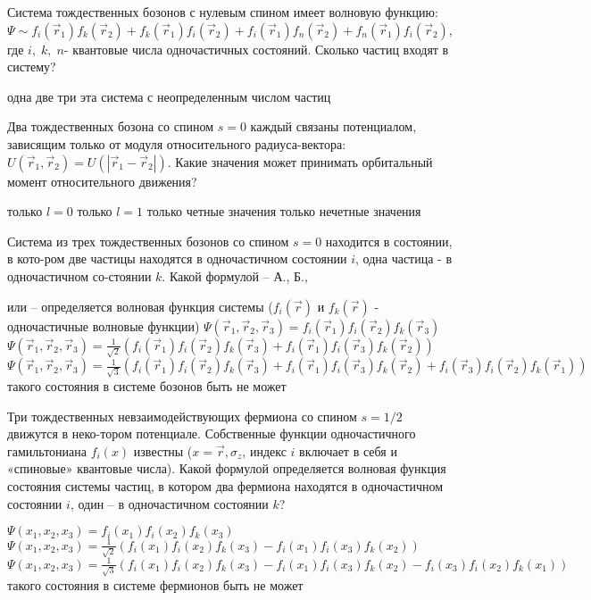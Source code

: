 \documentclass[11pt,a4paper]{exam}
\begin{document}
\begin{questions}
\question Система тождественных бозонов с нулевым спином имеет волновую функцию:
$\Psi  \sim {f_i}({\vec r_1}){f_k}({\vec r_2}) + {f_k}({\vec r_1}){f_i}({\vec r_2}) + {f_i}({\vec r_1}){f_n}({\vec r_2}) + {f_n}({\vec r_1}){f_i}({\vec r_2})$, 
где $i,\;k,\;n$- квантовые числа одночастичных состояний. Сколько частиц входят в систему?
\begin{choices}
\choice одна  
\choice две      
\choice три      
\choice эта система с неопределенным числом частиц
\end{choices}

\question Два тождественных бозона со спином $s = 0$ каждый связаны потенциалом, зависящим только от модуля относительного радиуса-вектора: $U({\vec r_1},{\vec r_2}) = U(|{\vec r_1} - {\vec r_2}|)$. Какие значения может принимать орбитальный момент относительного движения?
\begin{choices}
\choice только $l = 0$          
\choice только $l = 1$
\choice только четные значения        
\choice только нечетные значения
\end{choices}

\question Система из трех тождественных бозонов со спином $s = 0$ находится в состоянии, в кото-ром две частицы находятся в одночастичном состоянии $i$, одна частица - в одночастичном со-стоянии $k$. Какой формулой – А., Б., 
\begin{choices}
\choice или 
\choice – определяется волновая функция системы (${f_i}(\vec r)$ и ${f_k}(\vec r)$ - одночастичные волновые функции)
\choice $\Psi ({\vec r_1},{\vec r_2},{\vec r_3}) = {f_i}({\vec r_1}){f_i}({\vec r_2}){f_k}({\vec r_3})$ 
\choice $\Psi ({\vec r_1},{\vec r_2},{\vec r_3}) = \frac{1}{{\sqrt 2 }}\left( {{f_i}({{\vec r}_1}){f_i}({{\vec r}_2}){f_k}({{\vec r}_3}) + {f_i}({{\vec r}_1}){f_i}({{\vec r}_3}){f_k}({{\vec r}_2})} \right)$   
\choice $\Psi ({\vec r_1},{\vec r_2},{\vec r_3}) = \frac{1}{{\sqrt 3 }}\left( {{f_i}({{\vec r}_1}){f_i}({{\vec r}_2}){f_k}({{\vec r}_3}) + {f_i}({{\vec r}_1}){f_i}({{\vec r}_3}){f_k}({{\vec r}_2}) + {f_i}({{\vec r}_3}){f_i}({{\vec r}_2}){f_k}({{\vec r}_1})} \right)$
\choice такого состояния в системе бозонов быть не может
\end{choices}

\question Три тождественных невзаимодействующих фермиона со спином $s = 1/2$ движутся в неко-тором потенциале. Собственные функции одночастичного гамильтониана ${f_i}(x)$ известны ($x = \vec r,{\sigma _z}$, индекс $i$ включает в себя и «спиновые» квантовые числа). Какой формулой определяется волновая функция состояния системы частиц, в котором два фермиона находятся в одночастичном состоянии $i$, один – в одночастичном состоянии $k$?
\begin{choices}
\choice $\Psi ({x_1},{x_2},{x_3}) = {f_i}({x_1}){f_i}({x_2}){f_k}({x_3})$
\choice $\Psi ({x_1},{x_2},{x_3}) = \frac{1}{{\sqrt 2 }}\left( {{f_i}({x_1}){f_i}({x_2}){f_k}({x_3}) - {f_i}({x_1}){f_i}({x_3}){f_k}({x_2})} \right)$
\choice $\Psi ({x_1},{x_2},{x_3}) = \frac{1}{{\sqrt 3 }}\left( {{f_i}({x_1}){f_i}({x_2}){f_k}({x_3}) - {f_i}({x_1}){f_i}({x_3}){f_k}({x_2}) - {f_i}({x_3}){f_i}({x_2}){f_k}({x_1})} \right)$
\choice такого состояния в системе фермионов быть не может
\end{choices}


\end{questions}
\end{document}
